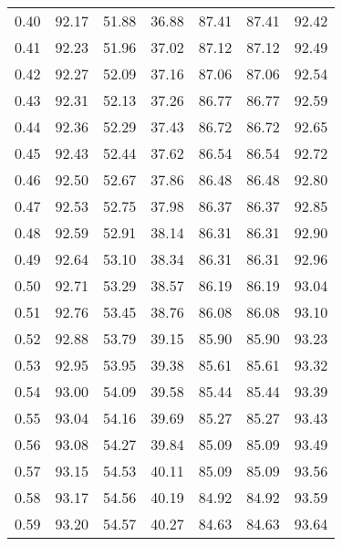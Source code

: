 \begin{tabular}{|c|c|c|c|c|c|c|}
      0.40 &     92.17 &     51.88 &      36.88 &   87.41 &      87.41 &         92.42 \\
      0.41 &     92.23 &     51.96 &      37.02 &   87.12 &      87.12 &         92.49 \\
      0.42 &     92.27 &     52.09 &      37.16 &   87.06 &      87.06 &         92.54 \\
      0.43 &     92.31 &     52.13 &      37.26 &   86.77 &      86.77 &         92.59 \\
      0.44 &     92.36 &     52.29 &      37.43 &   86.72 &      86.72 &         92.65 \\
      0.45 &     92.43 &     52.44 &      37.62 &   86.54 &      86.54 &         92.72 \\
      0.46 &     92.50 &     52.67 &      37.86 &   86.48 &      86.48 &         92.80 \\
      0.47 &     92.53 &     52.75 &      37.98 &   86.37 &      86.37 &         92.85 \\
      0.48 &     92.59 &     52.91 &      38.14 &   86.31 &      86.31 &         92.90 \\
      0.49 &     92.64 &     53.10 &      38.34 &   86.31 &      86.31 &         92.96 \\
      0.50 &     92.71 &     53.29 &      38.57 &   86.19 &      86.19 &         93.04 \\
      0.51 &     92.76 &     53.45 &      38.76 &   86.08 &      86.08 &         93.10 \\
      0.52 &     92.88 &     53.79 &      39.15 &   85.90 &      85.90 &         93.23 \\
      0.53 &     92.95 &     53.95 &      39.38 &   85.61 &      85.61 &         93.32 \\
      0.54 &     93.00 &     54.09 &      39.58 &   85.44 &      85.44 &         93.39 \\
      0.55 &     93.04 &     54.16 &      39.69 &   85.27 &      85.27 &         93.43 \\
      0.56 &     93.08 &     54.27 &      39.84 &   85.09 &      85.09 &         93.49 \\
      0.57 &     93.15 &     54.53 &      40.11 &   85.09 &      85.09 &         93.56 \\
      0.58 &     93.17 &     54.56 &      40.19 &   84.92 &      84.92 &         93.59 \\
      0.59 &     93.20 &     54.57 &      40.27 &   84.63 &      84.63 &         93.64 \\

\end{tabular}

